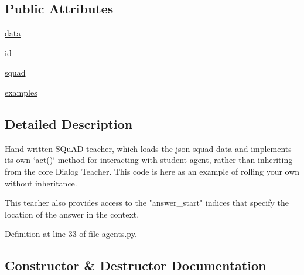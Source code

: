 \subsection*{Public Attributes}
\begin{DoxyCompactItemize}
\item 
\hyperlink{classparlai_1_1tasks_1_1squad_1_1agents_1_1IndexTeacher_a5642534b352e57c59dec249f9305d80d}{data}
\item 
\hyperlink{classparlai_1_1tasks_1_1squad_1_1agents_1_1IndexTeacher_a7c35d02788f1d513a7b815083cfecbf8}{id}
\item 
\hyperlink{classparlai_1_1tasks_1_1squad_1_1agents_1_1IndexTeacher_a419cb93430d8865d83f4968daf3b77d1}{squad}
\item 
\hyperlink{classparlai_1_1tasks_1_1squad_1_1agents_1_1IndexTeacher_a2ab5fd73dc8ce2b290aebd13f40540b5}{examples}
\end{DoxyCompactItemize}


\subsection{Detailed Description}
\begin{DoxyVerb}Hand-written SQuAD teacher, which loads the json squad data and implements its own
`act()` method for interacting with student agent, rather than inheriting from the
core Dialog Teacher. This code is here as an example of rolling your own without
inheritance.

This teacher also provides access to the "answer_start" indices that specify the
location of the answer in the context.
\end{DoxyVerb}
 

Definition at line 33 of file agents.\+py.



\subsection{Constructor \& Destructor Documentation}
\mbox{\label{classparlai_1_1tasks_1_1squad_1_1agents_1_1IndexTeacher_ad198efa0868254d0ec2f45582e601849}} 
